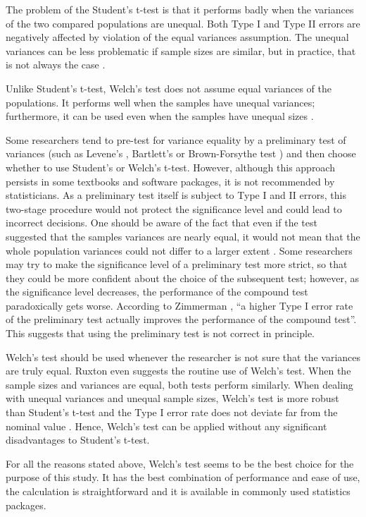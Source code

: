 The problem of the Student's t-test is that it performs badly when the variances of the two compared populations are unequal. Both Type I and Type II errors are negatively affected by violation of the equal variances assumption. The unequal variances can be less problematic if sample sizes are similar, but in practice, that is not always the case \cite{ruxton}.

Unlike Student's t-test, Welch's test does not assume equal variances of the populations. It performs well when the samples have unequal variances; furthermore, it can be used even when the samples have unequal sizes \cite{derrick}.

Some researchers tend to pre-test for variance equality by a preliminary test of variances (such as Levene's \cite{levene}, Bartlett's \cite{bartlett} or Brown-Forsythe test \cite{brown}) and then choose whether to use Student's or Welch's t-test. However, although this approach persists in some textbooks and software packages, it is not recommended by statisticians. As a preliminary test itself is subject to Type I and II errors, this two-stage procedure would not protect the significance level and could lead to incorrect decisions. One should be aware of the fact that even if the test suggested that the samples variances are nearly equal, it would not mean that the whole population variances could not differ to a larger extent \cite{zimmerman}. Some researchers may try to make the significance level of a preliminary test more strict, so that they could be more confident about the choice of the subsequent test; however, as the significance level decreases, the performance of the compound test paradoxically gets worse. According to Zimmerman \cite{zimmerman}, ``a higher Type I error rate of the preliminary test actually improves the performance of the compound test''. This suggests that using the preliminary test is not correct in principle.

Welch's test should be used whenever the researcher is not sure that the variances are truly equal. Ruxton \cite{ruxton} even suggests the routine use of Welch's test. When the sample sizes and variances are equal, both tests perform similarly. When dealing with unequal variances and unequal sample sizes, Welch's test is more robust than Student's t-test and the Type I error rate does not deviate far from the nominal value \cite{derrick}. Hence, Welch's test can be applied without any significant disadvantages to Student's t-test.

For all the reasons stated above, Welch's test seems to be the best choice for the purpose of this study. It has the best combination of performance and ease of use, the calculation is straightforward and it is available in commonly used statistics packages.

